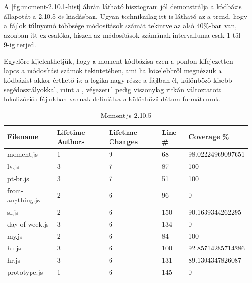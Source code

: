 A \ref{fig:moment-2.10.1-hist} ábrán látható hisztogram jól demonstrálja a kódbázis állapotát a 2.10.5-ös kiadásban. Ugyan technikailag itt is látható az a trend, hogy a fájlok túlnyomó többsége módosítások számát tekintve az alsó 40\%-ban van, azonban itt ez csalóka, hiszen az módosítások számának intervalluma csak 1-től 9-ig terjed.

Egyelőre kijelenthetjük, hogy a moment kódbázisa ezen a ponton kifejezetten lapos a módosítási számok tekintetében, ami ha közelebbről megnézzük a kódbázist akkor érthető is: a logika nagy része a  fájlban él, különböző kisebb segédosztályokkal, mint a , végezetül pedig viszonylag ritkán változtatott lokalizációs fájlokban vannak definiálva a különböző dátum formátumok.

\begin{table}[h]
    \centering
    \begin{tabular}{l|l|l|l|l}
        Filename         & Lifetime Authors & Lifetime Changes & Line \# & Coverage \%       \\ \hline
        moment.js        & 1                & 9                & 68      & 98.02224969097651 \\
        lv.js            & 3                & 7                & 87      & 100               \\
        pt-br.js         & 3                & 7                & 51      & 100               \\
        from-anything.js & 2                & 6                & 96      & 0                 \\
        sl.js            & 2                & 6                & 150     & 90.1639344262295  \\
        day-of-week.js   & 3                & 6                & 134     & 0                 \\
        my.js            & 2                & 6                & 84      & 100               \\
        hu.js            & 3                & 6                & 100     & 92.85714285714286 \\
        hr.js            & 3                & 6                & 131     & 89.1304347826087  \\
        prototype.js     & 1                & 6                & 145     & 0
    \end{tabular}
    \caption{Moment.js 2.10.5}
    \label{tab:moment-2105}
\end{table}

